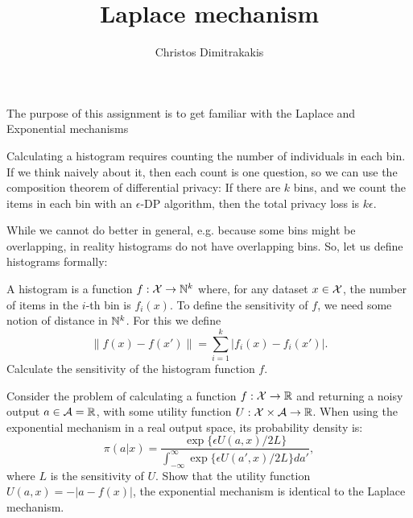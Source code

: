 \documentclass[a4paper]{article}
\title{Laplace mechanism}
\author{Christos Dimitrakakis}
\begin{document}
\maketitle
The purpose of this assignment is to get familiar with the Laplace and Exponential mechanisms

\begin{exercise}
  Calculating a histogram requires counting the number of individuals in each bin. If we think naively about it, then each count is one question, so we can use the composition theorem of differential privacy: If there are $k$ bins, and we count the items in each bin with an $\epsilon$-DP algorithm, then the total privacy loss is $k\epsilon$.

  While we cannot do better in general, e.g. because some bins might be overlapping, in reality histograms do not have overlapping bins. So, let us define histograms formally:

  A histogram is a function $f : {\mathcal{X}} \to {\mathbb{N}}^k$ where, for any dataset $x \in {\mathcal{X}}$, the number of items in the $i$-th bin is $f_i(x)$. To define the sensitivity of $f$, we need some notion of distance in ${\mathbb{N}}^k$. For this we define
  \[
    \|f(x) - f(x')\| = \sum_{i=1}^k |f_i(x) - f_i(x')|.
  \]
  Calculate the sensitivity of the histogram function $f$.
\end{exercise}


\begin{exercise}
  Consider the problem of calculating a function $f: {\mathcal{X}} \to {\mathbb{R}}$ and returning a noisy output $a \in {\mathcal{A}} = {\mathbb{R}}$,
  with some utility function  $U : {\mathcal{X}} \times {\mathcal{A}} \to {\mathbb{R}}$.
  When using the exponential mechanism in a real output space, its probability density is:
  \[
    \pi(a|x) = \frac{\exp\{\epsilon U(a,x) /2L \}}{\int_{-\infty}^\infty \exp\{\epsilon U(a',x) /2L \} da'},
  \]
  where $L$ is the sensitivity of $U$.
  Show that the utility function $U(a,x) = -|a - f(x)|$, the exponential mechanism is identical to the Laplace mechanism.

\end{exercise}
\end{document}
